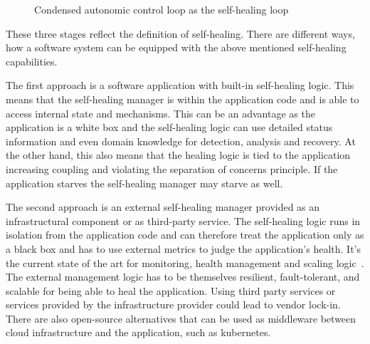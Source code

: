   \begin{figure}
    \centering
    \caption{Condensed autonomic control loop as the self-healing loop}
    \label{fig:self-healing-loop}
  \end{figure}

  These three stages reflect the definition of self-healing.
  There are different ways, how a software system can be equipped with the above mentioned self-healing capabilities.

  The first approach is a software application with built-in self-healing logic.
  This means that the self-healing manager is within the application code and is able to access internal state and mechanisms.
  This can be an advantage as the application is a white box and the self-healing logic can use detailed status information and even domain knowledge for detection, analysis and recovery.
  At the other hand, this also means that the healing logic is tied to the application increasing coupling and violating the separation of concerns principle.
  If the application starves the self-healing manager may starve as well.

  The second approach is an external self-healing manager provided as an infrastructural component or as third-party service.
  The self-healing logic runs in isolation from the application code and can therefore treat the application only as a black box and has to use external metrics to judge the application's health.
  It's the current state of the art for monitoring, health management and scaling logic~\cite{ToffettiMicroservices}.
  The external management logic has to be themselves resilient, fault-tolerant, and scalable for being able to heal the application.
  Using third party services or services provided by the infrastructure provider could lead to vendor lock-in.
  There are also open-source alternatives that can be used as middleware between cloud infrastructure and the application, such as \gls{kubernetes}.

